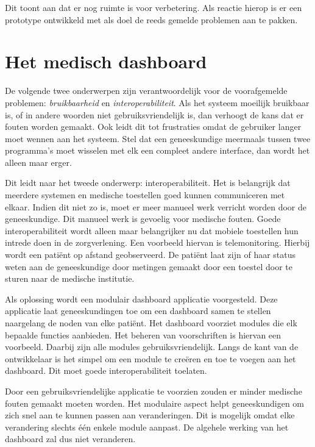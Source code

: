 \documentclass{article}
\begin{document}
Dit toont aan dat er nog ruimte is voor verbetering. Als reactie hierop is er een prototype ontwikkeld met als doel de reeds gemelde problemen aan te pakken.

\section{Het medisch dashboard}

De volgende twee onderwerpen zijn verantwoordelijk voor de voorafgemelde problemen: \emph{bruikbaarheid} en \emph{interoperabiliteit}. Als het systeem moeilijk bruikbaar is, of in andere woorden niet gebruiksvriendelijk is, dan verhoogt de kans dat er fouten worden gemaakt. Ook leidt dit tot frustraties omdat de gebruiker langer moet wennen aan het systeem. Stel dat een geneeskundige meermaals tussen twee programma's moet wisselen met elk een compleet andere interface, dan wordt het alleen maar erger.

Dit leidt naar het tweede onderwerp: interoperabiliteit. Het is belangrijk dat meerdere systemen en medische toestellen goed kunnen communiceren met elkaar. Indien dit niet zo is, moet er meer manueel werk verricht worden door de geneeskundige. Dit manueel werk is gevoelig voor medische fouten. Goede interoperabiliteit wordt alleen maar belangrijker nu dat mobiele toestellen hun intrede doen in de zorgverlening. Een voorbeeld hiervan is telemonitoring. Hierbij wordt een pati\"{e}nt op afstand geobserveerd. De pati\"{e}nt laat zijn of haar status weten aan de geneeskundige door metingen gemaakt door een toestel door te sturen naar de medische institutie.

Als oplossing wordt een modulair dashboard applicatie voorgesteld. Deze applicatie laat geneeskundingen toe om een dashboard samen te stellen naargelang de noden van elke pati\"{e}nt. Het dashboard voorziet modules die elk bepaalde functies aanbieden. Het beheren van voorschriften is hiervan een voorbeeld. Daarbij zijn alle modules gebruiksvriendelijk. Langs de kant van de ontwikkelaar is het simpel om een module te cre\"{e}ren en toe te voegen aan het dashboard. Dit moet goede interoperabiliteit toelaten.

Door een gebruiksvriendelijke applicatie te voorzien zouden er minder medische fouten gemaakt moeten worden. Het modulaire aspect helpt geneeskundigen om zich snel aan te kunnen passen aan veranderingen. Dit is mogelijk omdat elke verandering slechts \'{e}\'{e}n enkele module aanpast. De algehele werking van het dashboard zal dus niet veranderen.
\end{document}

